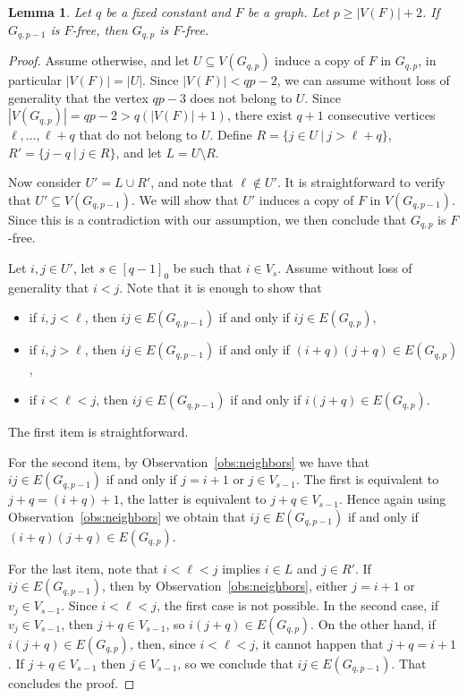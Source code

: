 \documentclass[11pt,a4paper]{article}
\theoremstyle{mystyle}
\newtheorem{lemma}[theorem]{Lemma}
\begin{document}
\begin{lemma}\label{lem:reducetofinite} 
Let $q$ be a fixed constant and $F$ be a graph.
Let $p \geq |V(F)|+2$.
If $G_{q,p-1}$ is $F$-free, then $G_{q,p}$ is $F$-free.
\end{lemma}
\begin{proof}
Assume otherwise, and let $U \subseteq V(G_{q,p})$ induce a copy of $F$ in $G_{q,p}$, in particular $|V(F)|=|U|$. 
Since $|V(F)| <qp-2$, we can assume without loss of generality that the vertex ${qp-3}$ does not belong to $U$.
Since $|V(G_{q,p})|=qp-2>q(|V(F)|+1)$, there exist $q+1$ consecutive vertices $\ell,\ldots,{\ell+q}$ that do not belong to $U$.
Define $R=\{j\in U~|~j>\ell+q\}$, $R'=\{{j-q}~|~j \in R\}$, and let $L=U\setminus R$.

Now consider $U'=L \cup R'$, and note that $\ell \notin U'$. It is straightforward to verify that $U' \subseteq V(G_{q,p-1})$.
We will show that $U'$ induces a copy of $F$ in $V(G_{q,p-1})$.
Since this is a contradiction with our assumption, we then conclude that $G_{q,p}$ is $F$-free.

Let $i,j \in U'$, let $s \in [q-1]_0$ be such that $i \in V_s$. Assume without loss of generality that $i <j$. 
Note that it is enough to show that
\begin{itemize}
    \item if $i,j < \ell$, then $ij \in E(G_{q,p-1})$ if and only if $ij \in E(G_{q,p})$, 
    \item if $i,j > \ell$, then $ij \in E(G_{q,p-1})$ if and only if $(i+q)(j+q) \in E(G_{q,p})$, 
    \item if $i < \ell < j$, then $ij \in E(G_{q,p-1})$ if and only if $i(j+q) \in E(G_{q,p})$.
\end{itemize}
The first item is straightforward.

For the second item, by Observation~\ref{obs:neighbors} we have that $ij \in E(G_{q,p-1})$ if and only if $j=i+1$ or $j\in V_{s-1}$. 
The first is equivalent to $j+q=(i+q)+1$, the latter is equivalent to ${j+q} \in V_{s-1}$.
Hence again using Observation~\ref{obs:neighbors} we obtain that  $ij \in E(G_{q,p-1})$ if and only if $({i+q})({j+q}) \in E(G_{q,p})$.

For the last item, note that $i < \ell < j$ implies $i \in L$ and $j \in R'$.
If $ij \in E(G_{q,p-1})$, then by Observation~\ref{obs:neighbors}, either $j=i+1$ or $v_j \in V_{s-1}$.
Since $i < \ell <j$, the first case is not possible.
In the second case, if $v_j \in V_{s-1}$, then ${j+q} \in V_{s-1}$, so $i({j+q}) \in E(G_{q,p})$. 
On the other hand, if $i({j+q}) \in E(G_{q,p})$, then, since $i < \ell <j$, it cannot happen that $j+q=i+1$.
If ${j+q} \in V_{s-1}$ then $j \in V_{s-1}$, so we conclude that $ij \in E(G_{q,p-1})$. 
That concludes the proof.
\end{proof}
\end{document}

